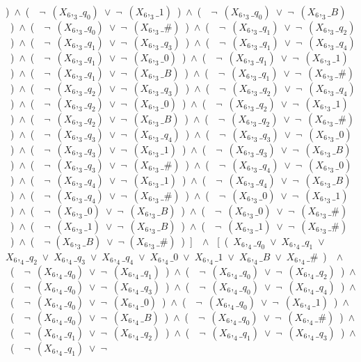 ﻿\documentclass[a4paper,10pt]{article}
\begin{document}
)\ $\wedge$\ (\ \ $\neg$\ $(X_6,_3\_q_0)$\ $\vee$\ $\neg$\ $(X_6,_3\_1)$\ )\ $\wedge$\ (\ \ $\neg$\ $(X_6,_3\_q_0)$\ $\vee$\ $\neg$\ $(X_6,_3\_B)$\ )\ $\wedge$\ (\ \ $\neg$\ $(X_6,_3\_q_0)$\ $\vee$\ $\neg$\ $(X_6,_3\_\#)$\ )\ $\wedge$\ (\ \ $\neg$\ $(X_6,_3\_q_1)$\ $\vee$\ $\neg$\ $(X_6,_3\_q_2)$\ )\ $\wedge$\ (\ \ $\neg$\ $(X_6,_3\_q_1)$\ $\vee$\ $\neg$\ $(X_6,_3\_q_3)$\ )\ $\wedge$\ (\ \ $\neg$\ $(X_6,_3\_q_1)$\ $\vee$\ $\neg$\ $(X_6,_3\_q_4)$\ )\ $\wedge$\ (\ \ $\neg$\ $(X_6,_3\_q_1)$\ $\vee$\ $\neg$\ $(X_6,_3\_0)$\ )\ $\wedge$\ (\ \ $\neg$\ $(X_6,_3\_q_1)$\ $\vee$\ $\neg$\ $(X_6,_3\_1)$\ )\ $\wedge$\ (\ \ $\neg$\ $(X_6,_3\_q_1)$\ $\vee$\ $\neg$\ $(X_6,_3\_B)$\ )\ $\wedge$\ (\ \ $\neg$\ $(X_6,_3\_q_1)$\ $\vee$\ $\neg$\ $(X_6,_3\_\#)$\ )\ $\wedge$\ (\ \ $\neg$\ $(X_6,_3\_q_2)$\ $\vee$\ $\neg$\ $(X_6,_3\_q_3)$\ )\ $\wedge$\ (\ \ $\neg$\ $(X_6,_3\_q_2)$\ $\vee$\ $\neg$\ $(X_6,_3\_q_4)$\ )\ $\wedge$\ (\ \ $\neg$\ $(X_6,_3\_q_2)$\ $\vee$\ $\neg$\ $(X_6,_3\_0)$\ )\ $\wedge$\ (\ \ $\neg$\ $(X_6,_3\_q_2)$\ $\vee$\ $\neg$\ $(X_6,_3\_1)$\ )\ $\wedge$\ (\ \ $\neg$\ $(X_6,_3\_q_2)$\ $\vee$\ $\neg$\ $(X_6,_3\_B)$\ )\ $\wedge$\ (\ \ $\neg$\ $(X_6,_3\_q_2)$\ $\vee$\ $\neg$\ $(X_6,_3\_\#)$\ )\ $\wedge$\ (\ \ $\neg$\ $(X_6,_3\_q_3)$\ $\vee$\ $\neg$\ $(X_6,_3\_q_4)$\ )\ $\wedge$\ (\ \ $\neg$\ $(X_6,_3\_q_3)$\ $\vee$\ $\neg$\ $(X_6,_3\_0)$\ )\ $\wedge$\ (\ \ $\neg$\ $(X_6,_3\_q_3)$\ $\vee$\ $\neg$\ $(X_6,_3\_1)$\ )\ $\wedge$\ (\ \ $\neg$\ $(X_6,_3\_q_3)$\ $\vee$\ $\neg$\ $(X_6,_3\_B)$\ )\ $\wedge$\ (\ \ $\neg$\ $(X_6,_3\_q_3)$\ $\vee$\ $\neg$\ $(X_6,_3\_\#)$\ )\ $\wedge$\ (\ \ $\neg$\ $(X_6,_3\_q_4)$\ $\vee$\ $\neg$\ $(X_6,_3\_0)$\ )\ $\wedge$\ (\ \ $\neg$\ $(X_6,_3\_q_4)$\ $\vee$\ $\neg$\ $(X_6,_3\_1)$\ )\ $\wedge$\ (\ \ $\neg$\ $(X_6,_3\_q_4)$\ $\vee$\ $\neg$\ $(X_6,_3\_B)$\ )\ $\wedge$\ (\ \ $\neg$\ $(X_6,_3\_q_4)$\ $\vee$\ $\neg$\ $(X_6,_3\_\#)$\ )\ $\wedge$\ (\ \ $\neg$\ $(X_6,_3\_0)$\ $\vee$\ $\neg$\ $(X_6,_3\_1)$\ )\ $\wedge$\ (\ \ $\neg$\ $(X_6,_3\_0)$\ $\vee$\ $\neg$\ $(X_6,_3\_B)$\ )\ $\wedge$\ (\ \ $\neg$\ $(X_6,_3\_0)$\ $\vee$\ $\neg$\ $(X_6,_3\_\#)$\ )\ $\wedge$\ (\ \ $\neg$\ $(X_6,_3\_1)$\ $\vee$\ $\neg$\ $(X_6,_3\_B)$\ )\ $\wedge$\ (\ \ $\neg$\ $(X_6,_3\_1)$\ $\vee$\ $\neg$\ $(X_6,_3\_\#)$\ )\ $\wedge$\ (\ \ $\neg$ $(X_6,_3\_B)$\ $\vee$\ $\neg$ $(X_6,_3\_\#)$\ )\ ]\ \ $\wedge$ \ [\ (\ $X_6,_4\_q_0$\ $\vee$\ $X_6,_4\_q_1$\ $\vee$\ $X_6,_4\_q_2$\ $\vee$\ $X_6,_4\_q_3$\ $\vee$\ $X_6,_4\_q_4$\ $\vee$\ $X_6,_4\_0$\ $\vee$\ $X_6,_4\_1$\ $\vee$\ $X_6,_4\_B$\ $\vee$\ $X_6,_4\_\#$\ )\ \ $\wedge$ \ (\ \ $\neg$\ $(X_6,_4\_q_0)$\ $\vee$\ $\neg$\ $(X_6,_4\_q_1)$\ )\ $\wedge$\ (\ \ $\neg$\ $(X_6,_4\_q_0)$\ $\vee$\ $\neg$\ $(X_6,_4\_q_2)$\ )\ $\wedge$\ (\ \ $\neg$\ $(X_6,_4\_q_0)$\ $\vee$\ $\neg$\ $(X_6,_4\_q_3)$\ )\ $\wedge$\ (\ \ $\neg$\ $(X_6,_4\_q_0)$\ $\vee$\ $\neg$\ $(X_6,_4\_q_4)$\ )\ $\wedge$\ (\ \ $\neg$\ $(X_6,_4\_q_0)$\ $\vee$\ $\neg$\ $(X_6,_4\_0)$\ )\ $\wedge$\ (\ \ $\neg$\ $(X_6,_4\_q_0)$\ $\vee$\ $\neg$\ $(X_6,_4\_1)$\ )\ $\wedge$\ (\ \ $\neg$\ $(X_6,_4\_q_0)$\ $\vee$\ $\neg$\ $(X_6,_4\_B)$\ )\ $\wedge$\ (\ \ $\neg$\ $(X_6,_4\_q_0)$\ $\vee$\ $\neg$\ $(X_6,_4\_\#)$\ )\ $\wedge$\ (\ \ $\neg$\ $(X_6,_4\_q_1)$\ $\vee$\ $\neg$\ $(X_6,_4\_q_2)$\ )\ $\wedge$\ (\ \ $\neg$\ $(X_6,_4\_q_1)$\ $\vee$\ $\neg$\ $(X_6,_4\_q_3)$\ )\ $\wedge$\ (\ \ $\neg$\ $(X_6,_4\_q_1)$\ $\vee$\ $\neg$\ 
\end{document}
